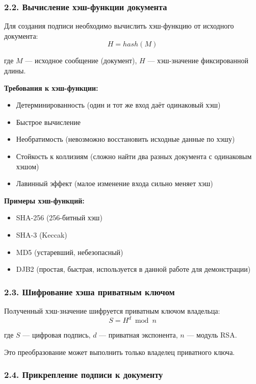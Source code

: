 \subsubsection*{2.2. Вычисление хэш-функции документа}

Для создания подписи необходимо вычислить хэш-функцию от исходного документа:
$$H = hash(M)$$

где $M$ — исходное сообщение (документ), $H$ — хэш-значение фиксированной длины.

\textbf{Требования к хэш-функции:}
\begin{itemize}
    \item Детерминированность (один и тот же вход даёт одинаковый хэш)
    \item Быстрое вычисление
    \item Необратимость (невозможно восстановить исходные данные по хэшу)
    \item Стойкость к коллизиям (сложно найти два разных документа с одинаковым хэшом)
    \item Лавинный эффект (малое изменение входа сильно меняет хэш)
\end{itemize}

\textbf{Примеры хэш-функций:}
\begin{itemize}
    \item SHA-256 (256-битный хэш)
    \item SHA-3 (Keccak)
    \item MD5 (устаревший, небезопасный)
    \item DJB2 (простая, быстрая, используется в данной работе для демонстрации)
\end{itemize}

\subsubsection*{2.3. Шифрование хэша приватным ключом}

Полученный хэш-значение шифруется приватным ключом владельца:
$$S = H^d \bmod n$$

где $S$ — цифровая подпись, $d$ — приватная экспонента, $n$ — модуль RSA.

Это преобразование может выполнить только владелец приватного ключа.

\subsubsection*{2.4. Прикрепление подписи к документу}

